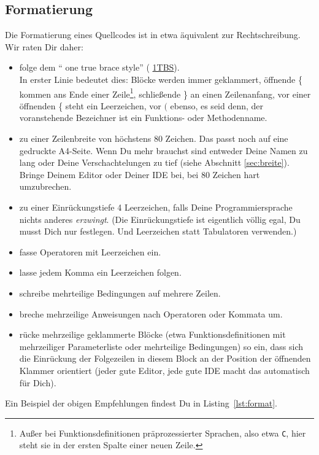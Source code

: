 \documentclass[twoside]{scrartcl}
\providecommand{\code}[1]{\texttt{#1}}
\begin{document}
\subsection{Formatierung\label{sec:format}}
Die Formatierung eines Quellcodes ist in etwa \"a{}quivalent zur
Rechtschreibung. Wir raten Dir daher:
\begin{itemize}
\item folge dem "` one true brace style"' (%
\href{http://en.wikipedia.org/wiki/Indent_style#Variant:_1TBS}{1TBS}).\\
  In erster Linie bedeutet dies: Bl\"o{}cke werden immer geklammert,
  \"o{}ffnende \{ kommen ans Ende einer
      Zeile\footnote{Au\ss{}er bei Funktionsdefinitionen pr\"a{}prozessierter
      Sprachen, also etwa \code{C}, hier steht sie in der ersten Spalte einer
  neuen Zeile.}, schlie\ss{}ende \} an einen Zeilenanfang, 
      vor einer
  \"o{}ffnenden \{ steht ein Leerzeichen, vor $($ ebenso, es seid denn,
  der voranstehende Bezeichner ist ein Funktions- oder Methodenname.
\item zu einer Zeilenbreite von h\"o{}chstens 80 Zeichen. Das passt
  noch auf eine gedruckte A4-Seite. Wenn Du mehr brauchst sind
  entweder Deine Namen zu lang oder Deine Verschachtelungen zu
  tief (siehe Abschnitt \ref{sec:breite}).
  Bringe Deinem Editor oder Deiner IDE bei, bei 80 Zeichen hart
  umzubrechen.
\item zu einer Einr\"u{}ckungstiefe 4 Leerzeichen, falls Deine
  Programmiersprache nichts anderes \emph{erzwingt}.
  (Die Einr\"u{}ckungstiefe ist eigentlich v\"o{}llig egal, Du
  musst Dich nur festlegen. Und Leerzeichen statt
  Tabulatoren verwenden.)
\item fasse Operatoren mit Leerzeichen ein.
\item lasse jedem Komma ein Leerzeichen folgen.
\item schreibe mehrteilige Bedingungen auf mehrere Zeilen.
\item breche mehrzeilige Anweisungen nach Operatoren oder Kommata um.
\item r\"u{}cke mehrzeilige geklammerte Bl\"o{}cke (etwa Funktionsdefinitionen 
    mit mehrzeiliger Parameterliste oder mehrteilige Bedingungen) so ein, dass 
    sich die Einr\"u{}ckung der Folgezeilen in diesem Block an der Position der
    \"o{}ffnenden Klammer orientiert (jeder gute Editor, jede gute IDE macht das
    automatisch f\"u{}r Dich).
\end{itemize}
Ein Beispiel der obigen Empfehlungen 
findest Du in Listing~\ref{lst:format}.

\end{document}
